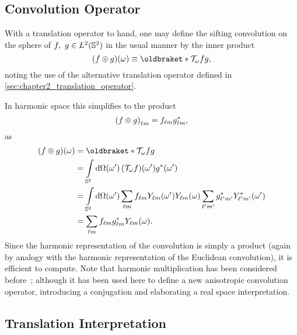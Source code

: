 \subsection{Convolution Operator}

With a translation operator to hand, one may define the sifting convolution on the sphere of \(f,\ g \in L^{2}(\mathbb{S}^{2})\) in the usual manner by the inner product
%
\begin{equation}\label{eq:chapter2_convolution_real}
	\pixel{\convolution{f}{g}}
	\equiv \braket{\translation{\omega}f}{g},
\end{equation}
%
noting the use of the alternative translation operator defined in \cref{sec:chapter2_translation_operator}.

In harmonic space this simplifies to the product
%
\begin{equation}\label{eq:chapter2_convolution_harmonic}
	{(f \circledcirc{} g)}_{\ell m}
	= {f}_{\ell m} {g}_{\ell m}^{\ast},
\end{equation}
%
as
%
\begin{align}
	\pixel{(f \circledcirc g)}
	 & = \braket{\translation{\omega}f}{g} \nonumber{}                                                                                                                                         \\
	 & = \integrateSphere{\omega'} \pixel[']{(\translation{\omega}f)} \pixel[']{\conj{g}} \nonumber{}                                                                                          \\
	 & = \integrateSphere{\omega'} \harmonicSum \harmonic{f} \pixel[']{\harmonic{Y}} \pixel{\harmonic{Y}} \harmonicSum['] \conj{\harmonic[']{g}} \pixel[']{\conj{\harmonic[']{Y}}} \nonumber{} \\
	 & = \harmonicSum \harmonic{f} \conj{\harmonic{g}} \pixel{\harmonic{Y}}.
\end{align}
%
Since the harmonic representation of the convolution is simply a product (again by analogy with the harmonic representation of the Euclidean convolution), it is efficient to compute.
Note that harmonic multiplication has been considered before~\cite{Kennedy2011}; although it has been used here to define a new anisotropic convolution operator, introducing a conjugation and elaborating a real space interpretation.

\subsection{Translation Interpretation}\label{sec:chapter2_translation_interpretation}

